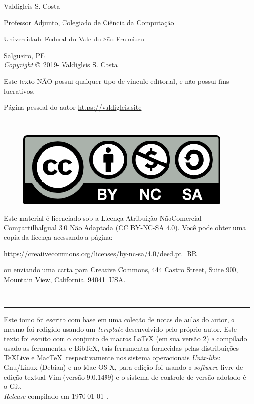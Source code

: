 \begingroup

\newpage
\thispagestyle{empty}

\noindent Valdigleis S. Costa

\noindent Professor Adjunto, Colegiado de Ciência da Computação

\noindent Universidade Federal do Vale do São Francisco

\noindent Salgueiro, PE\\

\noindent \textit{Copyright} \copyright\ 2019-{\the\year} Valdigleis S. Costa

\noindent Este texto  \textsc{NÃO}  possui qualquer tipo de vínculo editorial, e não possui fins lucrativos.

\noindent Página pessoal do autor \url{https://valdigleis.site}

~\vfill

\thispagestyle{empty}

\begin{figure}[h]
	\centering
	\includegraphics[width=0.15\linewidth]{fig/license}
\end{figure}
\noindent Este material é licenciado sob a Licença Atribuição-NãoComercial-CompartilhaIgual 3.0 Não Adaptada (CC BY-NC-SA 4.0).  Você pode obter uma copia da licença acessando a página: 
\begin{center}
	\url{https://creativecommons.org/licenses/by-nc-sa/4.0/deed.pt_BR}
\end{center}
\noindent ou enviando uma carta para Creative Commons, 444 Castro Street, Suite 900, Mountain View, California, 94041, USA.

~\vfill

\hrule
\vspace*{1cm}

\noindent Este tomo foi escrito com base em uma coleção de notas de aulas do autor, o mesmo foi redigido usando um \textit{template} desenvolvido pelo próprio autor. Este texto foi escrito com o conjunto de macros {\LaTeX} ({\color{NordAurora1}em sua versão 2}) e compilado usado as ferramentas {\LuaLaTeX} e {Bib\TeX}, tais ferramentas fornecidas pelas distribuições {\TeX}Live e Mac{\TeX}, respectivamente  nos sistema operacionais \textit{Unix-like}: Gnu/Linux ({\color{NordAurora1}Debian}) e no Mac OS X, para edição foi usando o \textit{software} livre  de edição textual Vim ({\color{NordAurora1}versão 9.0.1499}) e o sistema de controle de versão adotado é o Git. \\ 

\noindent \textit{Release} compilado em \today--\currenttime. %

\endgroup
